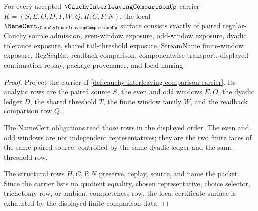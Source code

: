 \begin{theorem}
\label{thm:cauchy-interleaving-comparison-namecert-obligations}
For every accepted $\CauchyInterleavingComparisonUp$ carrier $K=(S,E,O,D,T,W,Q,H,C,P,N)$, the local $\NameCert_{\CauchyInterleavingComparisonUp}$ surface consists exactly of paired regular-Cauchy source admission, even-window exposure, odd-window exposure, dyadic tolerance exposure, shared tail-threshold exposure, StreamName finite-window exposure, RegSeqRat readback comparison, componentwise transport, displayed continuation replay, package provenance, and local naming.
\end{theorem}
\begin{proof}
Project the carrier of \autoref{def:cauchy-interleaving-comparison-carrier}. Its analytic rows are the paired source $S$, the even and odd windows $E,O$, the dyadic ledger $D$, the shared threshold $T$, the finite window family $W$, and the readback comparison row $Q$.

The NameCert obligations read those rows in the displayed order. The even and odd windows are not independent representatives; they are the two finite faces of the same paired source, controlled by the same dyadic ledger and the same threshold row.

The structural rows $H,C,P,N$ preserve, replay, source, and name the packet. Since the carrier lists no quotient equality, chosen representative, choice selector, trichotomy row, or ambient completeness row, the local certificate surface is exhausted by the displayed finite comparison data.
\end{proof}

